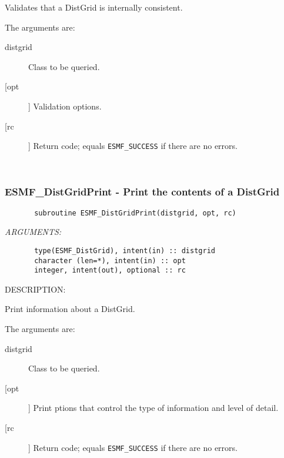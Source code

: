        Validates that a DistGrid is internally consistent.
  
       The arguments are:
       \begin{description}
       \item[distgrid] 
            Class to be queried.
       \item[[opt]]
            Validation options.
       \item[[rc]] 
            Return code; equals {\tt ESMF\_SUCCESS} if there are no errors.
       \end{description}
   
 
\mbox{}\hrulefill\ 
 
\subsubsection{ESMF\_DistGridPrint - Print the contents of a DistGrid}


 
\begin{verbatim}       subroutine ESMF_DistGridPrint(distgrid, opt, rc)\end{verbatim}{\em ARGUMENTS:}
\begin{verbatim}       type(ESMF_DistGrid), intent(in) :: distgrid      
       character (len=*), intent(in) :: opt      
       integer, intent(out), optional :: rc           \end{verbatim}
{\sf DESCRIPTION:\\ }


        Print information about a DistGrid.  
  
       The arguments are:
       \begin{description}
       \item[distgrid] 
            Class to be queried.
       \item[[opt]]
            Print ptions that control the type of information and level of 
            detail.
       \item[[rc]] 
            Return code; equals {\tt ESMF\_SUCCESS} if there are no errors.
       \end{description}
  
